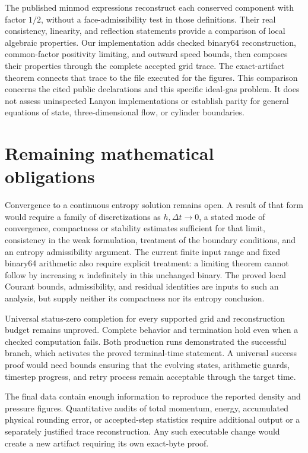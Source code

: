 \documentclass[11pt]{article}
\begin{document}
The published minmod expressions reconstruct each conserved component with factor $1/2$, without a face-admissibility test in those definitions.  Their real consistency, linearity, and reflection statements provide a comparison of local algebraic properties.  Our implementation adds checked binary64 reconstruction, common-factor positivity limiting, and outward speed bounds, then composes their properties through the complete accepted grid trace.  The exact-artifact theorem connects that trace to the file executed for the figures.  This comparison concerns the cited public declarations and this specific ideal-gas problem.  It does not assess uninspected Lanyon implementations or establish parity for general equations of state, three-dimensional flow, or cylinder boundaries.

\section{Remaining mathematical obligations}

Convergence to a continuous entropy solution remains open.  A result of that form would require a family of discretizations as $h,\Delta t\to0$, a stated mode of convergence, compactness or stability estimates sufficient for that limit, consistency in the weak formulation, treatment of the boundary conditions, and an entropy admissibility argument.  The current finite input range and fixed binary64 arithmetic also require explicit treatment: a limiting theorem cannot follow by increasing $n$ indefinitely in this unchanged binary.  The proved local Courant bounds, admissibility, and residual identities are inputs to such an analysis, but supply neither its compactness nor its entropy conclusion.

Universal status-zero completion for every supported grid and reconstruction budget remains unproved.  Complete behavior and termination hold even when a checked computation fails.  Both production runs demonstrated the successful branch, which activates the proved terminal-time statement.  A universal success proof would need bounds ensuring that the evolving states, arithmetic guards, timestep progress, and retry process remain acceptable through the target time.

The final data contain enough information to reproduce the reported density and pressure figures.  Quantitative audits of total momentum, energy, accumulated physical rounding error, or accepted-step statistics require additional output or a separately justified trace reconstruction.  Any such executable change would create a new artifact requiring its own exact-byte proof.
\end{document}
